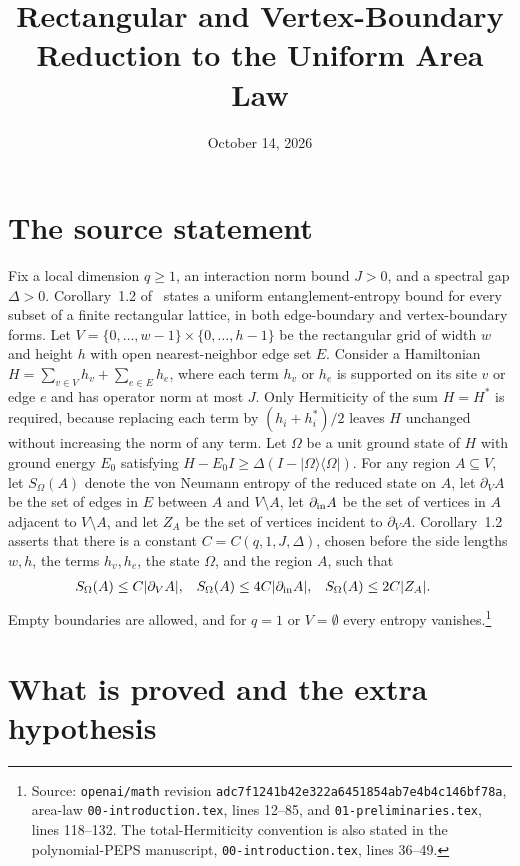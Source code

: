 \documentclass{article}
\title{Rectangular and Vertex-Boundary Reduction to the Uniform Area Law}
\author{}
\date{October 14, 2026}
\begin{document}
\maketitle
{}

\section{The source statement}

Fix a local dimension $q\ge1$, an interaction norm bound $J>0$, and a spectral
gap $\Delta>0$. Corollary~1.2 of~\cite{OpenAI2026AreaLaw} states a uniform
entanglement-entropy bound for every subset of a finite rectangular lattice, in
both edge-boundary and vertex-boundary forms. Let
$V=\{0,\ldots,w-1\}\times\{0,\ldots,h-1\}$ be the rectangular grid of width $w$
and height $h$ with open nearest-neighbor edge set $E$. Consider a Hamiltonian
$H=\sum_{v\in V} h_v+\sum_{e\in E} h_e$, where each term $h_v$ or $h_e$ is
supported on its site $v$ or edge $e$ and has operator norm at most $J$. Only
Hermiticity of the sum $H=H^*$ is required, because replacing each term by
$(h_i+h_i^*)/2$ leaves $H$ unchanged without increasing the norm of any term.
Let $\Omega$ be a unit ground state of $H$ with ground energy $E_0$ satisfying
$H-E_0I\ge\Delta(I-|\Omega\rangle\langle\Omega|)$. For any region
$A\subseteq V$, let $S_\Omega(A)$ denote the von Neumann entropy of the reduced
state on $A$, let $\partial_V A$ be the set of edges in $E$ between $A$ and
$V\setminus A$, let $\partial_{\rm in}A$ be the set of vertices in $A$ adjacent
to $V\setminus A$, and let $Z_A$ be the set of vertices incident to
$\partial_V A$. Corollary~1.2 asserts that there is a constant
$C=C(q,1,J,\Delta)$, chosen before the side lengths $w,h$, the terms $h_v,h_e$,
the state $\Omega$, and the region $A$, such that
\begin{align}
 S_\Omega(A)&\le C|\partial_V A|,
 &S_\Omega(A)&\le4C|\partial_{\rm in}A|,
 &S_\Omega(A)&\le2C|Z_A|.
 \label{eq:rectangular_scope_bounds}
\end{align}
Empty boundaries are allowed, and for $q=1$ or $V=\emptyset$ every entropy
vanishes.\footnote{Source: \texttt{openai/math} revision
\texttt{adc7f1241b42e322a6451854ab7e4b4c146bf78a}, area-law
\texttt{00-introduction.tex}, lines 12--85, and
\texttt{01-preliminaries.tex}, lines 118--132. The total-Hermiticity convention
is also stated in the polynomial-PEPS manuscript, \texttt{00-introduction.tex},
lines 36--49.}

\section{What is proved and the extra hypothesis}
\end{document}
